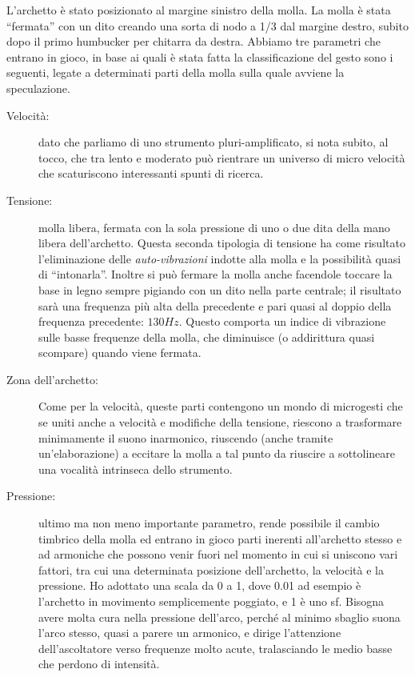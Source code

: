 L’archetto è stato posizionato al margine sinistro della molla. La molla è stata
“fermata” con un dito creando una sorta di nodo a 1/3  dal margine destro, subito
dopo il primo humbucker per chitarra da destra. Abbiamo tre parametri che entrano
in gioco, in base ai quali è stata fatta la classificazione del gesto sono i
seguenti, legate a determinati parti della molla sulla quale avviene la speculazione.

\begin{description}
  \item[Velocità:] dato che parliamo di uno strumento pluri-amplificato,
    si nota subito, al tocco, che tra lento e moderato può rientrare un universo di
    micro velocità che scaturiscono interessanti spunti di ricerca.
		\item[Tensione:] molla libera, fermata con la sola pressione di uno o due dita
		della mano libera dell’archetto. Questa seconda tipologia di tensione ha come
		risultato l’eliminazione delle \textit{auto-vibrazioni} indotte alla molla e
		la possibilità quasi di “intonarla”. Inoltre si può fermare la molla anche
		facendole toccare la base in legno sempre pigiando con un dito nella parte
		centrale; il risultato sarà una frequenza più alta della precedente e pari
		quasi al doppio della frequenza precedente: $130Hz$. Questo comporta un indice
		di vibrazione sulle basse frequenze della molla, che diminuisce (o addirittura
		quasi scompare) quando viene fermata.
		\item[Zona dell’archetto:] Come per la velocità, queste parti contengono un
		mondo di microgesti che se uniti anche a velocità e modifiche della tensione,
		riescono a trasformare minimamente il suono inarmonico, riuscendo (anche
		tramite un’elaborazione) a eccitare la molla a tal punto da riuscire a
		sottolineare una vocalità intrinseca dello strumento.
		\item[Pressione:] ultimo ma non meno importante parametro, rende possibile
		il cambio timbrico della molla ed entrano in gioco parti inerenti all’archetto
		stesso e ad armoniche che possono venir fuori nel momento in cui si uniscono
		vari fattori, tra cui una determinata posizione dell’archetto, la velocità e
		la pressione. Ho adottato una scala da 0 a 1, dove 0.01 ad esempio è
		l’archetto in movimento semplicemente poggiato, e 1 è uno sf. Bisogna avere
		molta cura nella pressione dell’arco, perché al minimo sbaglio suona l’arco
		stesso, quasi a parere un armonico, e dirige l’attenzione dell’ascoltatore
		verso frequenze molto acute, tralasciando le medio basse che perdono di
		intensità.
\end{description}

